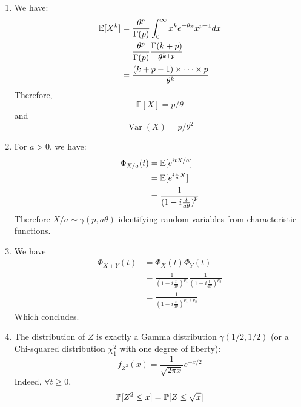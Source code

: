 
\begin{solution}
  \begin{enumerate}
    \item We have:
          \begin{align*}
            \mathbb{E}[X^k] & = \frac{\theta^p}{\Gamma(p)} \int_0^\infty x^k e^{-\theta x} x^{p-1} dx \\
                            & = \frac{\theta^p}{\Gamma(p)} \frac{\Gamma(k+p)}{\theta^{k+p}}           \\
                            & = \frac{(k+p-1) \times \cdots \times p}{\theta^k}
          \end{align*}
          Therefore,
          \[\mathbb{E}[X]=p / \theta \]
          and
          \[\operatorname{Var}(X)=p / \theta^{2}\]
    \item For $a > 0$, we have:
          \begin{align*}
            \Phi_{X/a}(t) & = \mathbb{E}[e^{itX/a}]                   \\
                          & = \mathbb{E}[e^{i\frac{t}{a}X}]           \\
                          & = \frac{1}{{(1-i \frac{t}{a\theta})}^{p}}
          \end{align*}
          Therefore $X/a \sim \gamma(p, a\theta)$ identifying random variables from characteristic functions.
    \item We have
          \begin{align*}
            \Phi_{X+Y}(t) & = \Phi_{X}(t) \Phi_{Y}(t)                                                             \\
                          & = \frac{1}{{(1-i \frac{t}{a\theta})}^{p_1}} \frac{1}{{(1-i \frac{t}{a\theta})}^{p_2}} \\
                          & = \frac{1}{{(1-i \frac{t}{a\theta})}^{p_1 + p_2}}
          \end{align*}
          Which concludes.
    \item The distribution of $Z$ is exactly a Gamma distribution $\gamma(1/2, 1/2)$ (or a Chi-squared distribution $\chi^2_1$ with one degree of liberty):
          \[
            f_{Z^2} (x) = \frac{1}{\sqrt{2 \pi x} }e^{-x/2}
          \]
          Indeed, $\forall t \geq 0$,
          \begin{align*}
            \proba{Z^2 \leq x} & = \proba{Z \leq \sqrt{x}}                                                 \\

\end{align*}
\end{enumerate}
\end{solution}
